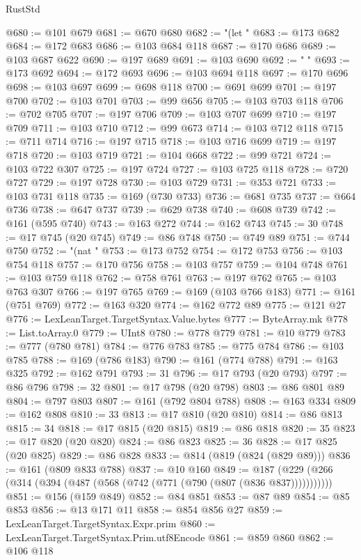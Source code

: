 \begin{lexlean}{RustStd}
\begin{coremodule}
{\begin{coremodule}
{{{{{{{{{{{{{{{{{{{{{{{{{{@680 := @101 @679
@681 := @670 @680
@682 := "(let "
@683 := @173 @682
@684 := @172 @683
@686 := @103 @684 @118
@687 := @170 @686
@689 := @103 @687 @622
@690 := @197 @689
@691 := @103 @690
@692 := " "
@693 := @173 @692
@694 := @172 @693
@696 := @103 @694 @118
@697 := @170 @696
@698 := @103 @697
@699 := @698 @118
@700 := @691 @699
@701 := @197 @700
@702 := @103 @701
@703 := @99 @656
@705 := @103 @703 @118
@706 := @702 @705
@707 := @197 @706
@709 := @103 @707 @699
@710 := @197 @709
@711 := @103 @710
@712 := @99 @673
@714 := @103 @712 @118
@715 := @711 @714
@716 := @197 @715
@718 := @103 @716 @699
@719 := @197 @718
@720 := @103 @719
@721 := @104 @668
@722 := @99 @721
@724 := @103 @722 @307
@725 := @197 @724
@727 := @103 @725 @118
@728 := @720 @727
@729 := @197 @728
@730 := @103 @729
@731 := @353 @721
@733 := @103 @731 @118
@735 := @169 (@730 @733)
@736 := @681 @735
@737 := @664 @736
@738 := @647 @737
@739 := @629 @738
@740 := @608 @739
@742 := @161 (@595 @740)
@743 := @163 @272
@744 := @162 @743
@745 := 30
@748 := @17 @745 (@20 @745)
@749 := @86 @748
@750 := @749 @89
@751 := @744 @750
@752 := "(nat "
@753 := @173 @752
@754 := @172 @753
@756 := @103 @754 @118
@757 := @170 @756
@758 := @103 @757
@759 := @104 @748
@761 := @103 @759 @118
@762 := @758 @761
@763 := @197 @762
@765 := @103 @763 @307
@766 := @197 @765
@769 := @169 (@103 @766 @183)
@771 := @161 (@751 @769)
@772 := @163 @320
@774 := @162 @772 @89
@775 := @121 @27
@776 := LexLeanTarget.TargetSyntax.Value.bytes
@777 := ByteArray.mk
@778 := List.toArray.{0}
@779 := UInt8
@780 := @778 @779
@781 := @10 @779
@783 := @777 (@780 @781)
@784 := @776 @783
@785 := @775 @784
@786 := @103 @785
@788 := @169 (@786 @183)
@790 := @161 (@774 @788)
@791 := @163 @325
@792 := @162 @791
@793 := 31
@796 := @17 @793 (@20 @793)
@797 := @86 @796
@798 := 32
@801 := @17 @798 (@20 @798)
@803 := @86 @801 @89
@804 := @797 @803
@807 := @161 (@792 @804 @788)
@808 := @163 @334
@809 := @162 @808
@810 := 33
@813 := @17 @810 (@20 @810)
@814 := @86 @813
@815 := 34
@818 := @17 @815 (@20 @815)
@819 := @86 @818
@820 := 35
@823 := @17 @820 (@20 @820)
@824 := @86 @823
@825 := 36
@828 := @17 @825 (@20 @825)
@829 := @86 @828
@833 := @814 (@819 (@824 (@829 @89)))
@836 := @161 (@809 @833 @788)
@837 := @10 @160
@849 := @187 (@229 (@266 (@314 (@394 (@487 (@568 (@742 (@771 (@790 (@807 (@836 @837)))))))))))
@851 := @156 (@159 @849)
@852 := @84 @851
@853 := @87 @89
@854 := @85 @853
@856 := @13 @171 @11
@858 := @854 @856 @27
@859 := LexLeanTarget.TargetSyntax.Expr.prim
@860 := LexLeanTarget.TargetSyntax.Prim.utf8Encode
@861 := @859 @860
@862 := @106 @118
}}}}}}}}}}}}}}}}}}}}}}}}}}
\end{coremodule}}
\end{coremodule}
\end{lexlean}
